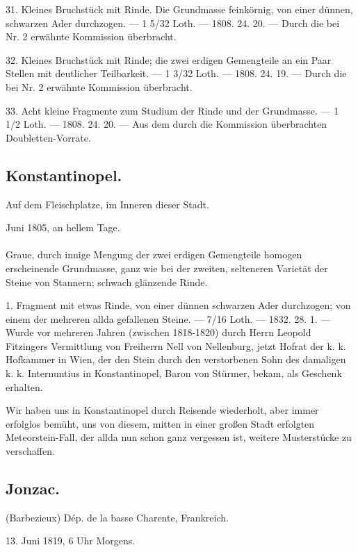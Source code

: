 \documentclass[a4paper, 11pt, oneside, polutonikogreek, german]{article}
\begin{document}
31. Kleines Bruchstück mit Rinde. Die Grundmasse feinkörnig, von einer dünnen, schwarzen Ader durchzogen. — 1 5/32 Loth. — 1808. 24. 20. — Durch die bei Nr. 2 erwähnte Kommission überbracht.

32. Kleines Bruchstück mit Rinde; die zwei erdigen Gemengteile an ein Paar Stellen mit deutlicher Teilbarkeit. — 1 3/32 Loth. — 1808. 24. 19. — Durch die bei Nr. 2 erwähnte Kommission überbracht.

33. Acht kleine Fragmente zum Studium der Rinde und der Grundmasse. — 1 1/2 Loth. — 1808. 24. 20. — Aus dem durch die Kommission überbrachten Doubletten-Vorrate.
\subsection{Konstantinopel.}
\begin{center}
\small
Auf dem Fleischplatze, im Inneren dieser Stadt.

Juni 1805, an hellem Tage.
\end{center}
\paragraph{}
Graue, durch innige Mengung der zwei erdigen Gemengteile homogen erscheinende Grundmasse, ganz wie bei der zweiten, selteneren Varietät der Steine von Stannern; schwach glänzende Rinde.

1. Fragment mit etwas Rinde, von einer dünnen schwarzen Ader durchzogen; von einem der mehreren allda gefallenen Steine. — 7/16 Loth. — 1832. 28. 1. — Wurde vor mehreren Jahren (zwischen 1818-1820) durch Herrn Leopold Fitzingers Vermittlung von Freiherrn Nell von Nellenburg, jetzt Hofrat der k. k. Hofkammer in Wien, der den Stein durch den verstorbenen Sohn des damaligen k. k. Internuntius in Konstantinopel, Baron von Stürmer, bekam, als Geschenk erhalten.

Wir haben uns in Konstantinopel durch Reisende wiederholt, aber immer erfolglos bemüht, uns von diesem, mitten in einer großen Stadt erfolgten Meteorstein-Fall, der allda nun schon ganz vergessen ist, weitere Musterstücke zu verschaffen.
\subsection{Jonzac.}
\begin{center}
\small
(Barbezieux) Dép. de la basse Charente, Frankreich.

13. Juni 1819, 6 Uhr Morgens.
\end{center}
\end{document}
